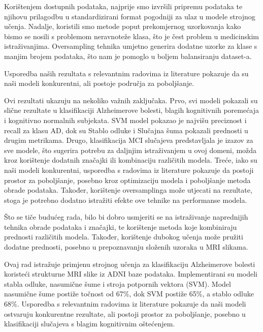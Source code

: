 \documentclass[zavrsnirad]{fer}
\begin{document}
Korištenjem dostupnih podataka, najprije smo izvršili pripremu podataka te njihovu prilagodbu u standardizirani format pogodniji za ulaz u modele strojnog učenja. Nadalje, koristili smo metode poput prekomjernog uzorkovanja kako bismo se nosili s problemom neravnoteže klasa, što je čest problem u medicinskim istraživanjima. Oversampling tehnika umjetno generira dodatne uzorke za klase s manjim brojem podataka, što nam je pomoglo u boljem balansiranju dataset-a.

Usporedba naših rezultata s relevantnim radovima iz literature pokazuje da su naši modeli konkurentni, ali postoje područja za poboljšanje.

Ovi rezultati ukazuju na nekoliko važnih zaključaka. 
Prvo, svi modeli pokazali su slične rezultate u klasifikaciji Alzheimerove bolesti, blagih kognitivnih poremećaja i kognitivno normalnih subjekata. SVM model pokazao je najvišu preciznost i recall za klasu AD, dok su Stablo odluke i Slučajna šuma pokazali prednosti u drugim metrikama.
Drugo, klasifikacija MCI slučajeva predstavljala je izazov za sve modele, što sugerira potrebu za daljnjim istraživanjem u ovoj domeni, možda kroz korištenje dodatnih značajki ili kombinaciju različitih modela.
Treće, iako su naši modeli konkurentni, usporedba s radovima iz literature pokazuje da postoji prostor za poboljšanje, posebno kroz optimizaciju modela i poboljšanje metoda obrade podataka. Također, korištenje oversamplinga može utjecati na rezultate, stoga je potrebno dodatno istražiti efekte ove tehnike na performanse modela.

Što se tiče budućeg rada, bilo bi dobro usmjeriti se na istraživanje naprednijih tehnika obrade podataka i značajki, te korištenje metoda koje kombiniraju prednosti različitih modela. Također, korištenje dubokog učenja može pružiti dodatne prednosti, posebno u prepoznavanju složenih uzoraka u MRI slikama.








\begin{sazetak}
	Ovaj rad istražuje primjenu strojnog učenja za klasifikaciju Alzheimerove bolesti koristeći strukturne MRI slike iz ADNI baze podataka. Implementirani su modeli stabla odluke, nasumične šume i stroja potpornih vektora (SVM). Model nasumične šume postiže točnost od 67\%, dok SVM postiže 65\%, a stablo odluke 68\%. Usporedba s relevantnim radovima iz literature pokazuje da naši modeli ostvaruju konkurentne rezultate, ali postoji prostor za poboljšanje, posebno u klasifikaciji slučajeva s blagim kognitivnim oštećenjem.
\end{sazetak}
\end{document}
